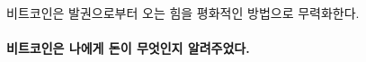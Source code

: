 비트코인은 발권으로부터 오는 힘을 평화적인 방법으로 무력화한다. 



\begin{comment}
	돈은 여러 차례 반복을 거치고 있다. 
	대부분의 반복은 괜찮았다. 어떤 식으로든 개선되었다.
	그러나 최근에 화폐의 내부 작동이 손상되었다.
	오늘날 거의 모든 화폐는 권력에 의해 무에서 유를 창조하고 있다. 
	어떻게 이런 일이 벌어졌는지 이해하기 위해 나는 돈의 역사와 몰락에 대해 배워야 했다.
\end{comment}

\begin{comment}
	이 부패를 바로잡기 위해서 일련의 재앙이 불어닥쳐야할지 아니면 단순히 훌륭한 교육이 필요할지는 아직 미지수이다. 
	하지만 건전 화폐의 신에게 후자이기를 기도해본다.
\end{comment}


\paragraph{비트코인은 나에게 돈이 무엇인지 알려주었다.}

%
%
%
%
